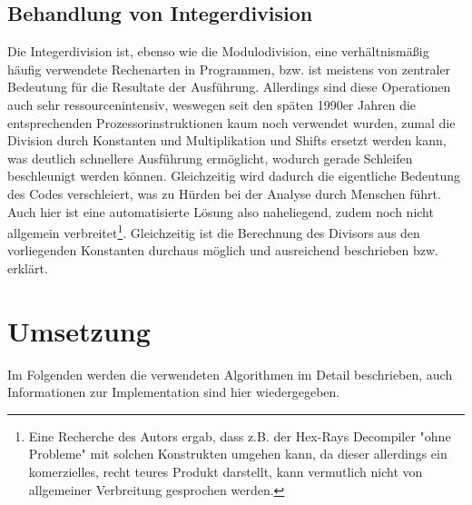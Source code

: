 \documentclass[11pt]{article}
\begin{document}
\subsection{Behandlung von Integerdivision} Die Integerdivision ist, ebenso wie die Modulodivision,
eine verhältnismäßig häufig verwendete Rechenarten in Programmen, bzw. ist meistens von zentraler
Bedeutung für die Resultate der Ausführung. Allerdings sind diese Operationen auch sehr
ressourcenintensiv, weswegen seit den späten 1990er Jahren die entsprechenden Prozessorinstruktionen
kaum noch verwendet wurden, zumal die Division durch Konstanten und Multiplikation und Shifts
ersetzt werden kann, was deutlich schnellere Ausführung ermöglicht\cite{division:2}, wodurch
gerade Schleifen beschleunigt werden können. Gleichzeitig wird dadurch die eigentliche
Bedeutung des Codes verschleiert, was zu Hürden bei der Analyse durch Menschen führt. Auch hier ist
eine automatisierte Lösung also naheliegend, zudem noch nicht allgemein verbreitet\footnote{Eine
Recherche des Autors ergab, dass z.B. der Hex-Rays Decompiler "ohne Probleme" mit solchen
Konstrukten umgehen kann, da dieser allerdings ein komerzielles, recht teures Produkt
darstellt, kann vermutlich nicht von allgemeiner Verbreitung gesprochen werden.}. Gleichzeitig ist
die Berechnung des Divisors aus den vorliegenden Konstanten durchaus möglich und ausreichend
beschrieben bzw. erklärt\cite{stackexchange:4}.

\section{Umsetzung} Im Folgenden werden die verwendeten Algorithmen im Detail beschrieben,
auch Informationen zur Implementation sind hier wiedergegeben.
\end{document}
